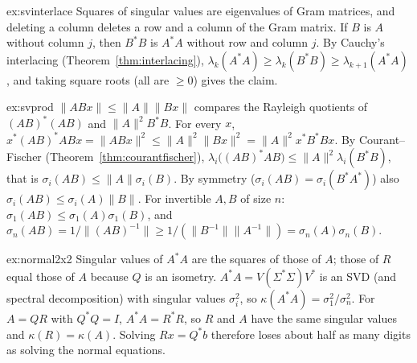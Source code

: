 \begin{solution}{ex:svinterlace}
\idea Squares of singular values are eigenvalues of Gram matrices, and deleting a column deletes a row and a column of
the Gram matrix.
\writeup If $B$ is $A$ without column $j$, then $B^*B$ is $A^*A$ without row and column $j$. By Cauchy's interlacing
(Theorem~\ref{thm:interlacing}), $\lambda_k(A^*A)\ge\lambda_k(B^*B)\ge\lambda_{k+1}(A^*A)$, and taking square roots (all are
$\ge0$) gives the claim.
\end{solution}

\begin{solution}{ex:svprod}
\idea $\|ABx\|\le\|A\|\|Bx\|$ compares the Rayleigh quotients of $(AB)^*(AB)$ and $\|A\|^2B^*B$.
\writeup For every $x$, $x^*(AB)^*ABx=\|ABx\|^2\le\|A\|^2\|Bx\|^2=\|A\|^2x^*B^*Bx$. By Courant--Fischer
(Theorem~\ref{thm:courantfischer}), $\lambda_i\bigl((AB)^*AB\bigr)\le\|A\|^2\lambda_i(B^*B)$, that is $\sigma_i(AB)\le\|A\|\sigma_i(B)$.
By symmetry ($\sigma_i(AB)=\sigma_i(B^*A^*)$) also $\sigma_i(AB)\le\sigma_i(A)\|B\|$. For invertible $A,B$ of size $n$:
$\sigma_1(AB)\le\sigma_1(A)\sigma_1(B)$, and $\sigma_n(AB)=1/\|(AB)^{-1}\|\ge1/(\|B^{-1}\|\|A^{-1}\|)=\sigma_n(A)\sigma_n(B)$.
\end{solution}

\begin{solution}{ex:normal2x2}
\idea Singular values of $A^*A$ are the squares of those of $A$; those of $R$ equal those of $A$ because $Q$ is an isometry.
\writeup $A^*A=V(\Sigma^*\Sigma)V^*$ is an SVD (and spectral decomposition) with singular values $\sigma_i^2$, so $\kappa(A^*A)=
\sigma_1^2/\sigma_n^2$. For $A=QR$ with $Q^*Q=I$, $A^*A=R^*R$, so $R$ and $A$ have the same singular values and $\kappa(R)=
\kappa(A)$. Solving $Rx=Q^*b$ therefore loses about half as many digits as solving the normal equations.
\end{solution}

